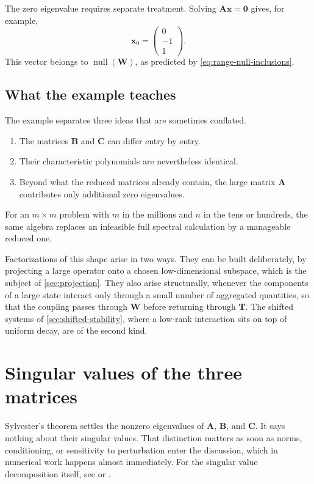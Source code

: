 \documentclass[11pt]{article}
\newcommand{\mat}[1]{\mathbf{#1}}
\newcommand{\vect}[1]{\mathbf{#1}}
\newcommand{\nullsp}{\operatorname{null}}
\theoremstyle{definition}
\theoremstyle{remark}
\begin{document}
The zero eigenvalue requires separate treatment. Solving \(\mat{A}\vect{x}=\vect{0}\) gives, for example,
\begin{equation}
  \vect{x}_{0}
  =
  \begin{pmatrix}0\\-1\\1\end{pmatrix}.
  \label{eq:example1-zero-vector}
\end{equation}
This vector belongs to \(\nullsp(\mat{W})\), as predicted by \cref{eq:range-null-inclusions}.

\subsection{What the example teaches}

The example separates three ideas that are sometimes conflated.
\begin{enumerate}[label=\arabic*.]
  \item The matrices \(\mat{B}\) and \(\mat{C}\) can differ entry by entry.
  \item Their characteristic polynomials are nevertheless identical.
  \item Beyond what the reduced matrices already contain, the large matrix \(\mat{A}\) contributes only additional zero eigenvalues.
\end{enumerate}

For an \(m\times m\) problem with \(m\) in the millions and \(n\) in the tens or hundreds, the same algebra replaces an infeasible full spectral calculation by a manageable reduced one.

Factorizations of this shape arise in two ways. They can be built deliberately, by projecting a large operator onto a chosen low-dimensional subspace, which is the subject of \cref{sec:projection}. They also arise structurally, whenever the components of a large state interact only through a small number of aggregated quantities, so that the coupling passes through \(\mat{W}\) before returning through \(\mat{T}\). The shifted systems of \cref{sec:shifted-stability}, where a low-rank interaction sits on top of uniform decay, are of the second kind.

\section{Singular values of the three matrices}
\label{sec:singular-values}

Sylvester's theorem settles the nonzero eigenvalues of \(\mat{A}\), \(\mat{B}\), and \(\mat{C}\). It says nothing about their singular values. That distinction matters as soon as norms, conditioning, or sensitivity to perturbation enter the discussion, which in numerical work happens almost immediately. For the singular value decomposition itself, see \textcite{trefethen1997numerical} or \textcite{golub2013matrix}.
\end{document}
